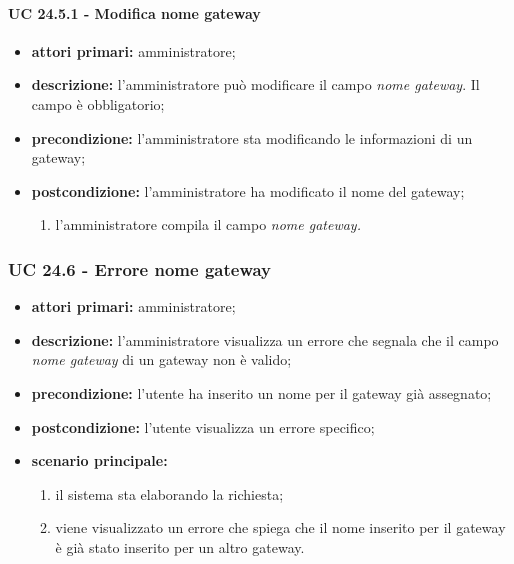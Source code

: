 				\paragraph{UC 24.5.1 - Modifica nome gateway}
				\begin{itemize}
					\item \textbf{attori primari:} amministratore;
					\item \textbf{descrizione:} l'amministratore può modificare il campo \textit{nome gateway}. Il campo è obbligatorio;
					\item \textbf{precondizione:} l'amministratore sta modificando le informazioni di un gateway;
					\item \textbf{postcondizione:} l'amministratore ha modificato il nome del gateway;
					\begin{enumerate}
						\item{l'amministratore compila il campo \textit{nome gateway.}}
					\end{enumerate} 
				\end{itemize}

			\subsubsection{UC 24.6 - Errore nome gateway}
			\begin{itemize}
				\item \textbf{attori primari:} amministratore;
				\item \textbf{descrizione:} l'amministratore visualizza un errore che segnala che il campo \textit{nome gateway} di un gateway non è valido;
				\item \textbf{precondizione:} l'utente ha inserito un nome per il gateway già assegnato;
				\item \textbf{postcondizione:} l'utente visualizza un errore specifico;
				\item \textbf{scenario principale:}
				\begin{enumerate}
					\item il sistema sta elaborando la richiesta;
					\item viene visualizzato un errore che spiega che il nome inserito per il gateway è già stato inserito per un altro gateway.
				\end{enumerate}
			\end{itemize}
			
		
